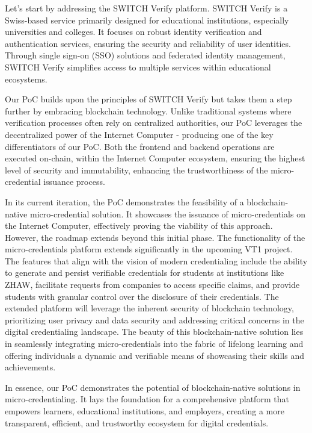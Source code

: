 \documentclass{article}
\begin{document}
\begin{multicols}{2}
    Let's start by addressing the SWITCH Verify platform. SWITCH Verify is a Swiss-based service primarily designed for educational institutions, especially universities and colleges. It focuses on robust identity verification and authentication services, ensuring the security and reliability of user identities. Through single sign-on (SSO) solutions and federated identity management, SWITCH Verify simplifies access to multiple services within educational ecosystems.

    Our PoC builds upon the principles of SWITCH Verify but takes them a step further by embracing blockchain technology. Unlike traditional systems where verification processes often rely on centralized authorities, our PoC leverages the decentralized power of the Internet Computer - producing one of the key differentiators of our PoC. Both the frontend and backend operations are executed on-chain, within the Internet Computer ecosystem, ensuring the highest level of security and immutability, enhancing the trustworthiness of the micro-credential issuance process.

    In its current iteration, the PoC demonstrates the feasibility of a blockchain-native micro-credential solution. It showcases the issuance of micro-credentials on the Internet Computer, effectively proving the viability of this approach. However, the roadmap extends beyond this initial phase. The functionality of the micro-credentials platform extends significantly in the upcoming VT1 project. The features that align with the vision of modern credentialing include the ability to generate and persist verifiable credentials for students at institutions like ZHAW, facilitate requests from companies to access specific claims, and provide students with granular control over the disclosure of their credentials. The extended platform will leverage the inherent security of blockchain technology, prioritizing user privacy and data security and addressing critical concerns in the digital credentialing landscape. The beauty of this blockchain-native solution lies in seamlessly integrating micro-credentials into the fabric of lifelong learning and offering individuals a dynamic and verifiable means of showcasing their skills and achievements.

    In essence, our PoC demonstrates the potential of blockchain-native solutions in micro-credentialing. It lays the foundation for a comprehensive platform that empowers learners, educational institutions, and employers, creating a more transparent, efficient, and trustworthy ecosystem for digital credentials.

    
    

\end{multicols}
\end{document}
